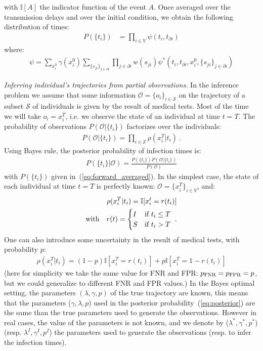 \documentclass[a4paper, amsfonts, amssymb, amsmath, reprint, showkeys, nofootinbib, twoside, floatfix, pre,superscriptaddress]{revtex4-2}
\begin{document}
with $\mathbb{I}[A]$ the indicator function of the event $A$.
Once averaged over the transmission delays and over the initial condition, we obtain the following distribution of times:
\begin{align}
	\label{eq:forward_averaged}
	P(\{t_i\})&=\prod_{i\in V}\psi(t_i, t_{\partial i})
\end{align}
where:
\begin{align*}
	\psi=\sum_{x_i^0}\gamma(x_i^0)\sum_{\{s_{ji}\}_{j\in\partial i}}\prod_{j\in\partial i}w(s_{ji})\psi^*(t_i, t_{\partial i}, x_i^0, \{s_{ji}\}_{j\in\partial i})
\end{align*}

{\it Inferring individual's trajectories from partial observations.}
In the inference problem we assume that some information $\mathcal{O}=\{o_i\}_{i\in\mathcal{S}}$ on the trajectory of a subset $\mathcal{S}$ of individuals is given by the result of medical tests. 
Most of the time we will take $o_i=x_i^T$, i.e. we observe the state of an individual at time $t=T$.
The probability of observations $P(\mathcal{O}|\{t_i\})$ factorizes over the individuals:
\begin{align}
\label{eq:observations}
P(\mathcal{O}|\{t_i\})=\prod_{i\in\mathcal{S}}\rho(x_i^T|t_i) \ .
\end{align}
Using Bayes rule, the posterior probability of infection times is:
\begin{align}
\label{eq:posterior}
	P(\{t_i\}|\mathcal{O}) = \frac{P(\{t_i\})P(\mathcal{O}|\{t_i\})}{P(\mathcal{O})}
\end{align}
with $P(\{t_i\})$ given in~(\ref{eq:forward_averaged}).
In the simplest case, the state of each individual at time $t=T$ is perfectly known: $\mathcal{O}=\{x_i^T\}_{i\in V}$, and:
\begin{align*}
	\rho(x_i^T|t_i)=\mathbb{I}[x_i^t=r(t_i) ] \\
	{\rm with} \quad r(t)=\begin{cases}
		I & \text{if $t_i\leq T$}\\
		S & \text{if $t_i>T$}
\end{cases} \ .	
\end{align*}
One can also introduce some uncertainty in the result of medical tests, with probability $p$:
\begin{align}
	\label{eq:prob_falserate}
	\rho(x_i^T|t_i)=(1-p)\mathbb{I}[x_i^T= r(t_i)] + p\mathbb{I}[x_i^T= 1-r(t_i)] 
\end{align}
(here for simplicity we take the same value for FNR and FPR: $p_{\rm FNR}=p_{\rm FPR}=p$, but we could generalize to different FNR and FPR values.)
In the Bayes optimal setting, the parameters $(\lambda,\gamma, p)$ of the true trajectory are known, this means that the parameters ($\gamma, \lambda, p$) used in the posterior probability~(\ref{eq:posterior}) are the same than the true parameters used to generate the observations.
However in real cases, the value of the parameters is not known, and we denote by ($\lambda^*, \gamma^*, p^*$) (resp. $\lambda^I, \gamma^I, p^I$) the parameters used to generate the observations (resp. to infer the infection times).
\end{document}
